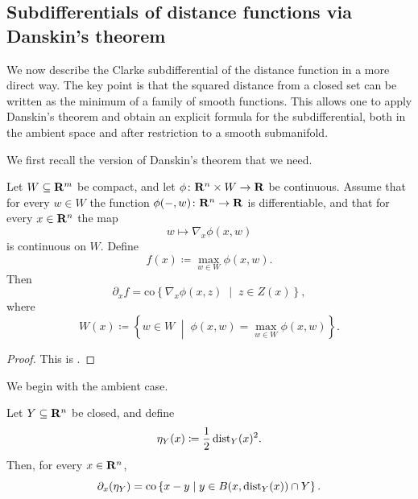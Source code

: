 \subsection{Subdifferentials of distance functions via Danskin's theorem}

We now describe the Clarke subdifferential of the distance function in a more direct way. The key point is that the squared distance from a closed set can be written as the minimum of a family of smooth functions. This allows one to apply Danskin's theorem and obtain an explicit formula for the subdifferential, both in the ambient space and after restriction to a smooth submanifold.

We first recall the version of Danskin's theorem that we need.

\begin{proposition}\label{D!P:danskin}
  Let $W \subseteq \mathbf{R}^m$ be compact, and let $\phi \colon \mathbf{R}^n \times W \to \mathbf{R}$ be continuous. Assume that for every $w \in W$ the function $\phi(-,w)\colon \mathbf{R}^n \to \mathbf{R}$ is differentiable, and that for every $x \in \mathbf{R}^n$ the map
  \[
    w \mapsto \nabla_x \phi(x,w)
  \]
  is continuous on $W$. Define
  \[
    f(x) \coloneq \max_{w \in W} \phi(x,w).
  \]
  Then
  \[
    \partial_x f = \mathrm{co}\left\{ \nabla_x \phi(x,z) \;\middle|\; z \in Z(x)\right\},
  \]
  where
  \[
    W(x) \coloneq \left\{ w \in W \;\middle|\; \phi(x,w)=\max_{w \in W}\phi(x,w)\right\}.
  \]
\end{proposition}

\begin{proof}
This is \cite[Prop.~B.22(b)]{Bertsekas2016}.
\end{proof}

We begin with the ambient case.

\begin{proposition}\label{D!P:squared-distance-subgradient}
  Let $Y \subseteq \mathbf{R}^n$ be closed, and define
  \[
    \eta_Y(x)\coloneq \frac{1}{2}\operatorname{dist}_Y(x)^2.
  \]
  Then, for every $x \in \mathbf{R}^n$,
  \[
    \partial_x(\eta_Y)= \mathrm{co}\left\{ x-y \;\middle|\; y \in B(x,\operatorname{dist}_Y(x)) \cap Y \right\}.
  \]
\end{proposition}

